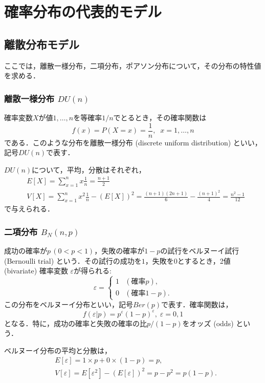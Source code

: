 \documentclass{jsreport}
\begin{document}
\chapter{確率分布の代表的モデル}
\section{離散分布モデル}
ここでは，離散一様分布，二項分布，ポアソン分布について，その分布の特性値を求める．
\subsection{離散一様分布 $DU(n)$}
確率変数$X$が値$1, \ldots, n$を等確率$1/n$でとるとき，その確率関数は
\begin{equation}
  f(x) = P(X = x) = \frac{1}{n}, \; \; x = 1, \ldots, n \nonumber
\end{equation}
である．このような分布を離散一様分布 (discrete uniform distribution) といい，記号$DU(n)$で表す．

$DU(n)$について，平均，分散はそれぞれ，
\begin{align}
  &E[X] = \sum_{x = 1}^n x \frac{1}{n} = \frac{n + 1}{2} \nonumber \\
  &V[X] = \sum_{x = 1}^n x^2 \frac{1}{n} - (E[X])^2 = \frac{(n + 1)(2n + 1)}{6} - \frac{(n + 1)^2}{4} = \frac{n^2 - 1}{12} \nonumber
\end{align}
で与えられる．

\subsection{二項分布 $B_N(n, p)$}
成功の確率が$p \, (0 < p < 1)$，失敗の確率が$1 - p$の試行をベルヌーイ試行 (Bernoulli trial) という．その試行の成功を$1$，失敗を$0$とするとき，2値 (bivariate) 確率変数 $\varepsilon$が得られる:
\begin{equation}
  \varepsilon = \begin{cases}
    1 & (確率p), \\
    0 & (確率1 - p).
\end{cases}\nonumber
\end{equation}
この分布をベルヌーイ分布といい，記号$Ber(p)$で表す．確率関数は，
\begin{equation}
  f(\varepsilon | p) = p^{\varepsilon} (1 - p)^{\varepsilon}, \; \varepsilon = 0, 1 \nonumber
\end{equation}
となる．特に，成功の確率と失敗の確率の比$p/(1-p)$をオッズ (odds) という．

ベルヌーイ分布の平均と分散は，
\begin{align}
  &E[\varepsilon] = 1 \times p + 0 \times (1 - p) = p, \nonumber \\
  &V[\varepsilon] = E[\varepsilon^2] - (E[\varepsilon])^2 = p - p^2 = p(1 - p). \nonumber
\end{align}
\end{document}
